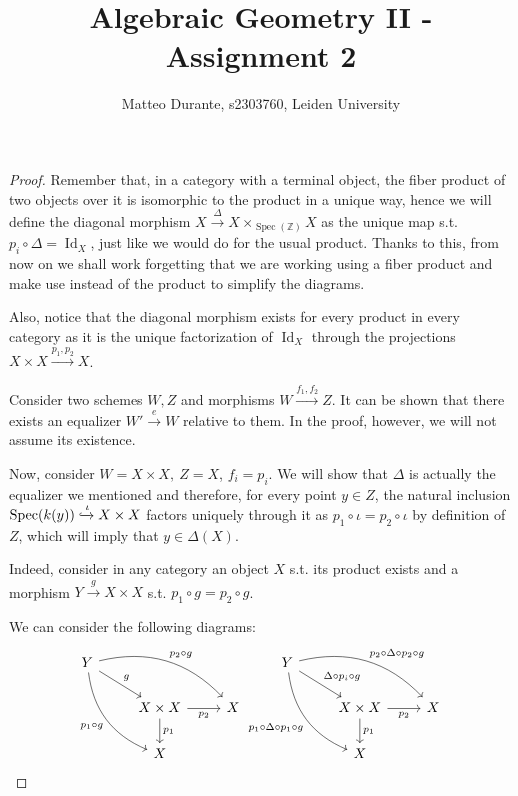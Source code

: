 \documentclass{article}
\newcommand{\numberset}{\mathbb}
\newcommand{\Z}{\numberset{Z}}
\newcommand{\exercise}[1]{\noindent {\bf Exercise #1}}
\DeclareMathOperator{\Id}{Id}
\DeclareMathOperator{\Spec}{Spec}
\begin{document}
\title{Algebraic Geometry II - Assignment 2}

\author{Matteo Durante, s2303760, Leiden University}

\maketitle

\exercise{1}

\begin{proof}
    Remember that, in a category with a terminal object, the fiber product of
    two objects over it is isomorphic to the product in a unique way, hence we
    will define the diagonal morphism $X\xrightarrow{\Delta}X\times_{\Spec(\Z)}X$
    as the unique map s.t. $p_i\circ\Delta=\Id_X$, just like we would do for the
    usual product. Thanks to this, from now on we shall work forgetting that we
    are working using a fiber product and make use instead of the product to
    simplify the diagrams.
    
    Also, notice that the diagonal morphism exists for every product in every
    category as it is the unique factorization of $\Id_X$ through the
    projections $X\times X\xrightarrow{p_1,p_2}X$.

    Consider two schemes $W,Z$ and morphisms $W\xrightarrow{f_1,f_2}Z$. It can
    be shown that there exists an equalizer $W'\xrightarrow{e}W$ relative to
    them. In the proof, however, we will not assume its existence.

    Now, consider $W=X\times X,\ Z=X$, $f_i=p_i$. We will show that
    $\Delta$ is actually the equalizer we mentioned and therefore, for every
    point $y\in Z$, the natural inclusion $\Spec(k(y))\xhookrightarrow{\iota}
    X\times X$ factors uniquely through it as $p_1\circ\iota=p_2\circ\iota$
    by definition of $Z$, which will imply that $y\in\Delta(X)$.

    Indeed, consider in any category an object $X$
    s.t. its product exists and a morphism $Y\xrightarrow{g}X\times X$ s.t.
    $p_1\circ g=p_2\circ g$.

    We can consider the following diagrams:
    \[
    \begin{tikzcd}
        Y\arrow[bend left]{drr}{p_2\circ g}\arrow[bend
        right,swap]{ddr}{p_1\circ g}\arrow{dr}{g} \\
        & X\times X\arrow[swap]{r}{p_2}\arrow{d}{p_1}
        & X \\
        & X
    \end{tikzcd}
    \begin{tikzcd}
        Y\arrow[bend left]{drr}{p_2\circ\Delta\circ p_2\circ g}\arrow[bend
        right,swap]{ddr}{p_1\circ\Delta\circ p_1\circ
        g}\arrow[description]{dr}{\Delta\circ p_i\circ g} \\
        & X\times X\arrow[swap]{r}{p_2}\arrow{d}{p_1}
        & X \\
        & X
    \end{tikzcd}
    \]


\end{proof}
\end{document}
